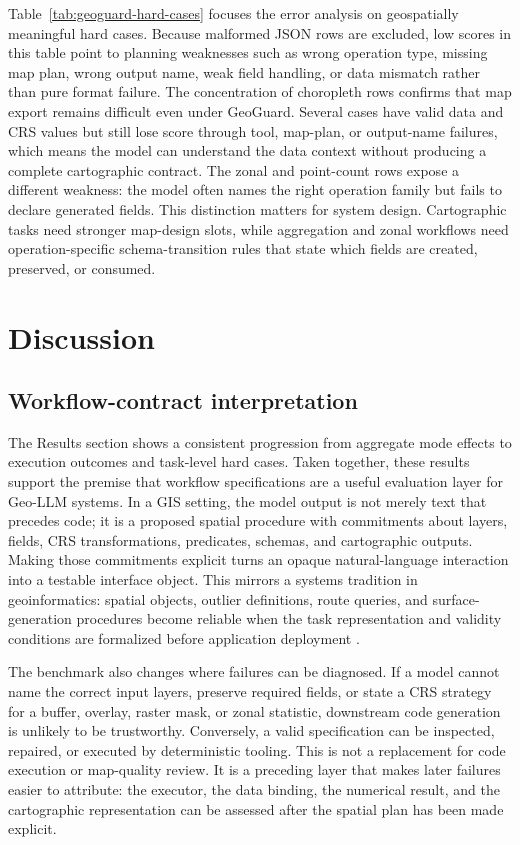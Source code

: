 \documentclass[12pt]{gsis}  %
\begin{document}
Table~\ref{tab:geoguard-hard-cases} focuses the error analysis on geospatially meaningful hard cases. Because malformed JSON rows are excluded, low scores in this table point to planning weaknesses such as wrong operation type, missing map plan, wrong output name, weak field handling, or data mismatch rather than pure format failure. The concentration of choropleth rows confirms that map export remains difficult even under GeoGuard. Several cases have valid data and CRS values but still lose score through tool, map-plan, or output-name failures, which means the model can understand the data context without producing a complete cartographic contract. The zonal and point-count rows expose a different weakness: the model often names the right operation family but fails to declare generated fields. This distinction matters for system design. Cartographic tasks need stronger map-design slots, while aggregation and zonal workflows need operation-specific schema-transition rules that state which fields are created, preserved, or consumed.

\section{Discussion}

\subsection{Workflow-contract interpretation}

The Results section shows a consistent progression from aggregate mode effects to execution outcomes and task-level hard cases. Taken together, these results support the premise that workflow specifications are a useful evaluation layer for Geo-LLM systems. In a GIS setting, the model output is not merely text that precedes code; it is a proposed spatial procedure with commitments about layers, fields, CRS transformations, predicates, schemas, and cartographic outputs. Making those commitments explicit turns an opaque natural-language interaction into a testable interface object. This mirrors a systems tradition in geoinformatics: spatial objects, outlier definitions, route queries, and surface-generation procedures become reliable when the task representation and validity conditions are formalized before application deployment \citep{Shekhar_1999_ObjectDirection,Shekhar_2003_SpatialOutliers,Yoo_2005_InRouteNN,Camelli_2012_SeamlessSurfaces}.

The benchmark also changes where failures can be diagnosed. If a model cannot name the correct input layers, preserve required fields, or state a CRS strategy for a buffer, overlay, raster mask, or zonal statistic, downstream code generation is unlikely to be trustworthy. Conversely, a valid specification can be inspected, repaired, or executed by deterministic tooling. This is not a replacement for code execution or map-quality review. It is a preceding layer that makes later failures easier to attribute: the executor, the data binding, the numerical result, and the cartographic representation can be assessed after the spatial plan has been made explicit.
\end{document}

